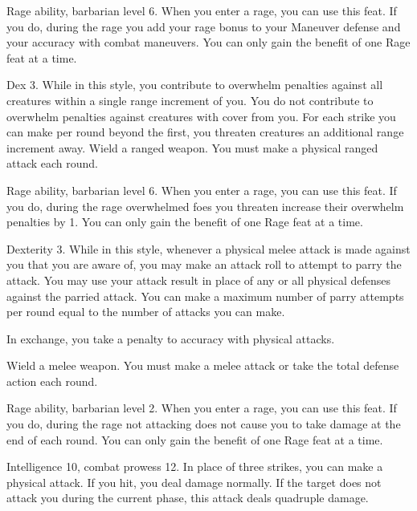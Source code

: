 \featpre Rage ability, barbarian level 6.
\featben When you enter a rage, you can use this feat. If you do, during the rage you add your rage bonus to your Maneuver defense and your accuracy with combat maneuvers.
 You can only gain the benefit of one Rage feat at a time.

\featpre Dex 3.
\featben While in this style, you contribute to overwhelm penalties against all creatures within a single range increment of you.
You do not contribute to overwhelm penalties against creatures with cover from you.
For each strike you can make per round beyond the first, you threaten creatures an additional range increment away.
\stylereq Wield a ranged weapon.
You must make a physical ranged attack each round.

\featpre Rage ability, barbarian level 6.
\featben When you enter a rage, you can use this feat. If you do, during the rage overwhelmed foes you threaten increase their overwhelm penalties by 1.
 You can only gain the benefit of one Rage feat at a time.

\featpre Dexterity 3.
\featben While in this style, whenever a physical melee attack is made against you that you are aware of, you may make an attack roll to attempt to parry the attack.
You may use your attack result in place of any or all physical defenses against the parried attack.
You can make a maximum number of parry attempts per round equal to the number of attacks you can make.

In exchange, you take a  penalty to accuracy with physical attacks.

\stylereq Wield a melee weapon.
You must make a melee attack or take the total defense action each round.

\featpre Rage ability, barbarian level 2.
\featben When you enter a rage, you can use this feat. If you do, during the rage not attacking does not cause you to take damage at the end of each round.
 You can only gain the benefit of one Rage feat at a time.

\featpre Intelligence 10, combat prowess 12.
\featben In place of three strikes, you can make a physical attack.
If you hit, you deal damage normally.
If the target does not attack you during the current phase, this attack deals quadruple damage.

